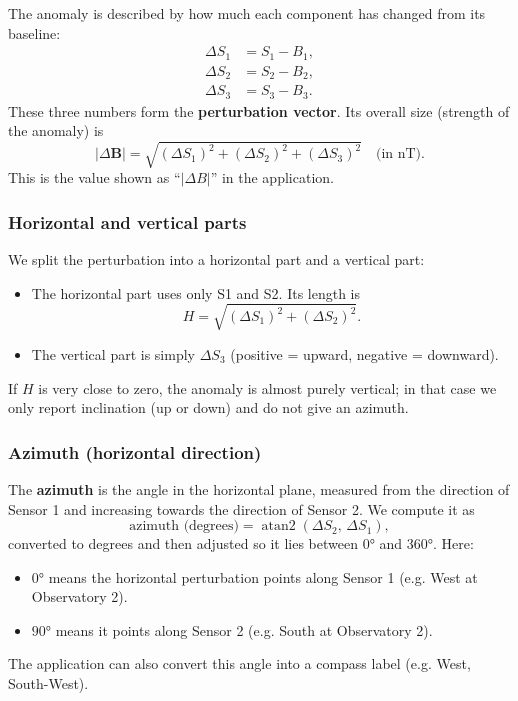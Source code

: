 \documentclass[11pt]{article}
\begin{document}
The anomaly is described by how much each component has changed from its baseline:
\begin{align}
  \Delta S_1 &= S_1 - B_1, \\
  \Delta S_2 &= S_2 - B_2, \\
  \Delta S_3 &= S_3 - B_3.
\end{align}
These three numbers form the \textbf{perturbation vector}. Its overall size (strength of the anomaly) is
\begin{equation}
  |\Delta\mathbf{B}| = \sqrt{(\Delta S_1)^2 + (\Delta S_2)^2 + (\Delta S_3)^2} \quad \text{(in nT)}.
\end{equation}
This is the value shown as ``\(|\Delta B|\)'' in the application.

\subsubsection{\textbf{Horizontal and vertical parts}}

We split the perturbation into a horizontal part and a vertical part:
\begin{itemize}
  \item The horizontal part uses only S1 and S2. Its length is
    \begin{equation}
      H = \sqrt{(\Delta S_1)^2 + (\Delta S_2)^2}.
    \end{equation}
  \item The vertical part is simply \(\Delta S_3\) (positive = upward, negative = downward).
\end{itemize}
If \(H\) is very close to zero, the anomaly is almost purely vertical; in that case we only report inclination (up or down) and do not give an azimuth.

\subsubsection{\textbf{Azimuth (horizontal direction)}}

The \textbf{azimuth} is the angle in the horizontal plane, measured from the direction of Sensor 1 and increasing towards the direction of Sensor 2. We compute it as
\begin{equation}
  \text{azimuth (degrees)} = \operatorname{atan2}(\Delta S_2,\, \Delta S_1),
\end{equation}
converted to degrees and then adjusted so it lies between \(0°\) and \(360°\). Here:
\begin{itemize}
  \item \(0°\) means the horizontal perturbation points along Sensor 1 (e.g. West at Observatory 2).
  \item \(90°\) means it points along Sensor 2 (e.g. South at Observatory 2).
\end{itemize}
The application can also convert this angle into a compass label (e.g. West, South-West).
\end{document}
